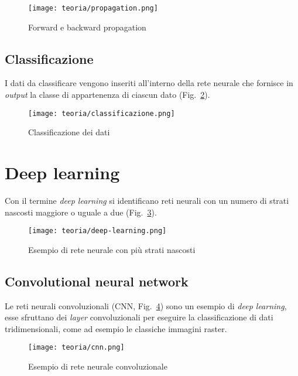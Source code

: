\begin{figure}[!h] 
    \centering 
    \texttt{[image: teoria/propagation.png]} 
    \caption{Forward e backward propagation}
    \label{fig:propagation}
  \end{figure}

\newpage
\subsection{Classificazione}
I dati da classificare vengono inseriti all'interno della rete neurale che fornisce in \emph{output} la classe di appartenenza di ciascun dato (Fig.~\ref{fig:classificazione}).

\begin{figure}[!h] 
    \centering 
    \texttt{[image: teoria/classificazione.png]} 
    \caption{Classificazione dei dati}
    \label{fig:classificazione}
  \end{figure}


\section{Deep learning}
Con il termine \emph{deep learning} si identificano reti neurali con un numero di strati nascosti maggiore o uguale a due (Fig.~\ref{fig:deep-learning}).

\begin{figure}[!h] 
    \centering 
    \texttt{[image: teoria/deep-learning.png]} 
    \caption{Esempio di rete neurale con più strati nascosti}
    \label{fig:deep-learning}
  \end{figure}

\subsection{Convolutional neural network}
Le reti neurali convoluzionali (CNN, Fig.~\ref{fig:cnn}) sono un esempio di \emph{deep learning}, esse sfruttano dei \emph{layer} convoluzionali per eseguire la classificazione di dati tridimensionali, come ad esempio le classiche immagini raster.

\begin{figure}[!h] 
    \centering 
    \texttt{[image: teoria/cnn.png]} 
    \caption{Esempio di rete neurale convoluzionale}
    \label{fig:cnn}
  \end{figure}

\newpage


